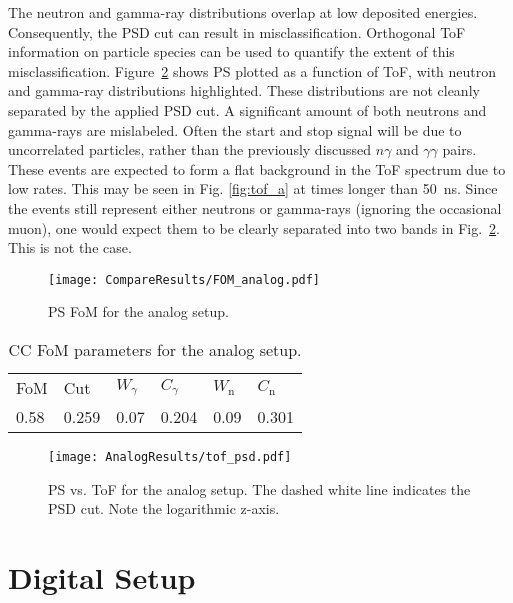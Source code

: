 \documentclass[main.tex]{subfiles}
\begin{document}
The neutron and gamma-ray distributions overlap at low deposited energies. Consequently, the PSD cut can result in misclassification. Orthogonal ToF information on particle species can be used to quantify the extent of this misclassification.
Figure~\ref{fig:tof_ps_a} shows PS plotted as a function of ToF, with neutron and gamma-ray distributions highlighted. 
These distributions are not cleanly separated by the applied PSD cut. A significant amount of both neutrons and gamma-rays are mislabeled. Often the start and stop signal will be due to uncorrelated particles, rather than the previously discussed $n\gamma$ and $\gamma\gamma$ pairs. These events are expected to form a flat background in the ToF spectrum due to low rates. This may be seen in Fig. \ref{fig:tof_a} at times longer than \SI{50}{ns}. Since the events still represent either neutrons or gamma-rays (ignoring the occasional muon), one would expect them to be clearly separated into two bands in Fig.~\ref{fig:tof_ps_a}. This is not the case.


\begin{figure}[h!]
	    \centering
    	    \texttt{[image: CompareResults/FOM\_analog.pdf]}
    \caption[PS FoM for the analog setup.]{PS FoM for the analog setup.}
    \label{fig:fom_a} 
\end{figure}
\begin{table}[h]
\center
\begin{tabular}{|l|l|l|l|l|l|}
\hline
FoM  & Cut   & $W_\gamma$ & $C_\gamma$ & $W_\textrm{n}$ & $C_\textrm{n}$ \\ \hhline{|=|=|=|=|=|=|}
0.58 & 0.259 & 0.07          & 0.204           & 0.09              & 0.301               \\ \hline
\end{tabular}
\caption{CC FoM parameters for the analog setup.}
\label{tab:fom_a}
\end{table}




\begin{figure}[h!]
    \centering
        \texttt{[image: AnalogResults/tof\_psd.pdf]}
        \caption[PS vs. ToF for the analog setup.]{PS vs. ToF for the analog setup. The dashed white line indicates the PSD cut. Note the logarithmic z-axis.}
    \label{fig:tof_ps_a} 
\end{figure}







\newpage
\section{Digital Setup}
\end{document}
